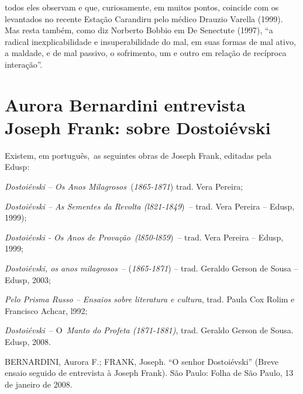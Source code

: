 todos eles observam e que, curiosamente, em muitos pontos, coincide com
os levantados no recente Estação Carandiru pelo médico Drauzio Varella
(1999). Mas resta também, como diz Norberto Bobbio em De Senectute
(1997), ``a radical inexplicabilidade e insuperabilidade do mal, em suas
formas de mal ativo, a maldade, e de mal passivo, o sofrimento, um e
outro em relação de recíproca interação''.

\chapter{Aurora Bernardini entrevista Joseph Frank: sobre Dostoiévski}

Existem, em português,~as seguintes obras de Joseph Frank, editadas pela
Edusp:~~

\emph{Dostoiévski -- Os Anos Milagrosos~}(\emph{1865-1871}) trad. Vera
Pereira;~

\emph{Dostoiévski -- As Sementes da Revolta (l821-1849})~-- trad. Vera
Pereira -- Edusp, 1999);

\emph{Dostoiévski - Os Anos de Provação~(l850-l859})~-- trad. Vera
Pereira -- Edusp, 1999;

\emph{Dostoiévski, os anos milagrosos}~-- (\emph{1865-1871}) -- trad.
Geraldo Gerson de Sousa -- Edusp, 2003;~

\emph{Pelo Prisma Russo -- Ensaios sobre literatura e cultura}, trad.
Paula Cox Rolim e Francisco Achcar, l992;\textbf{~}

\emph{Dostoiévski~}-- O~\emph{Manto do Profeta (1871-1881)}, trad.
Geraldo Gerson de Sousa. Edusp, 2008.

BERNARDINI, Aurora F.; FRANK, Joseph. ``O senhor Dostoiévski'' (Breve
ensaio seguido de entrevista à Joseph Frank). São Paulo: Folha de São
Paulo, 13 de janeiro de 2008.

